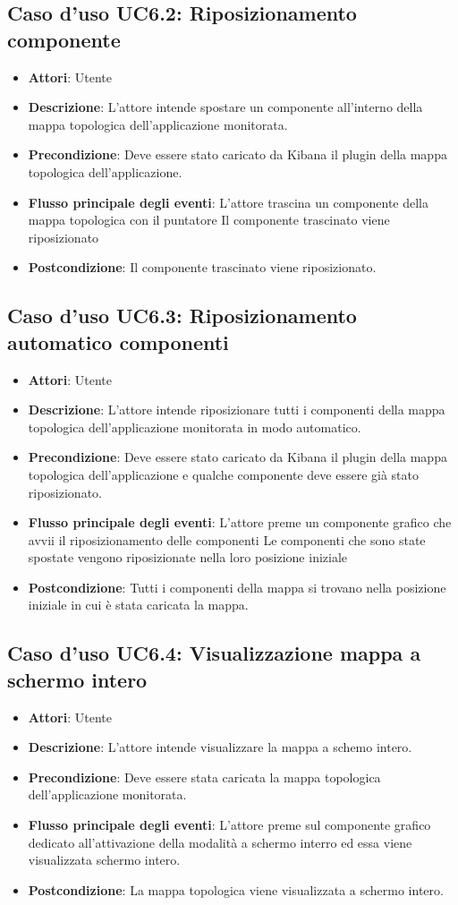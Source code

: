 \subsection{Caso d'uso UC6.2: Riposizionamento componente}
\begin{itemize}
\item \textbf{Attori}: Utente
\item \textbf{Descrizione}: L'attore intende spostare un componente all'interno della mappa topologica dell'applicazione monitorata.
\item \textbf{Precondizione}: Deve essere stato caricato da Kibana il plugin della mappa topologica dell'applicazione.
\item \textbf{Flusso principale degli eventi}: L'attore trascina un componente della mappa topologica con il puntatore
Il componente trascinato viene riposizionato
\item \textbf{Postcondizione}: Il componente trascinato viene riposizionato.
\end{itemize}
\subsection{Caso d'uso UC6.3: Riposizionamento automatico componenti}
\begin{itemize}
\item \textbf{Attori}: Utente
\item \textbf{Descrizione}: L'attore intende riposizionare tutti i componenti della mappa topologica dell'applicazione monitorata in modo automatico.
\item \textbf{Precondizione}: Deve essere stato caricato da Kibana il plugin della mappa topologica dell'applicazione e qualche componente deve essere già stato riposizionato.
\item \textbf{Flusso principale degli eventi}: L'attore preme un  componente grafico che avvii il riposizionamento delle componenti 
Le componenti che sono state spostate vengono riposizionate nella loro posizione iniziale
\item \textbf{Postcondizione}: Tutti i componenti della mappa si trovano nella posizione iniziale in cui è stata caricata la mappa. 
\end{itemize}
\subsection{Caso d'uso UC6.4: Visualizzazione mappa a schermo intero}
\begin{itemize}
\item \textbf{Attori}: Utente
\item \textbf{Descrizione}: L'attore intende visualizzare la mappa a schemo intero.
\item \textbf{Precondizione}: Deve essere stata caricata la mappa topologica dell'applicazione monitorata.
\item \textbf{Flusso principale degli eventi}: L'attore preme sul componente grafico dedicato all'attivazione della modalità a schermo interro ed essa viene visualizzata  schermo intero.
\item \textbf{Postcondizione}: La mappa topologica viene visualizzata a schermo intero.
\end{itemize}
